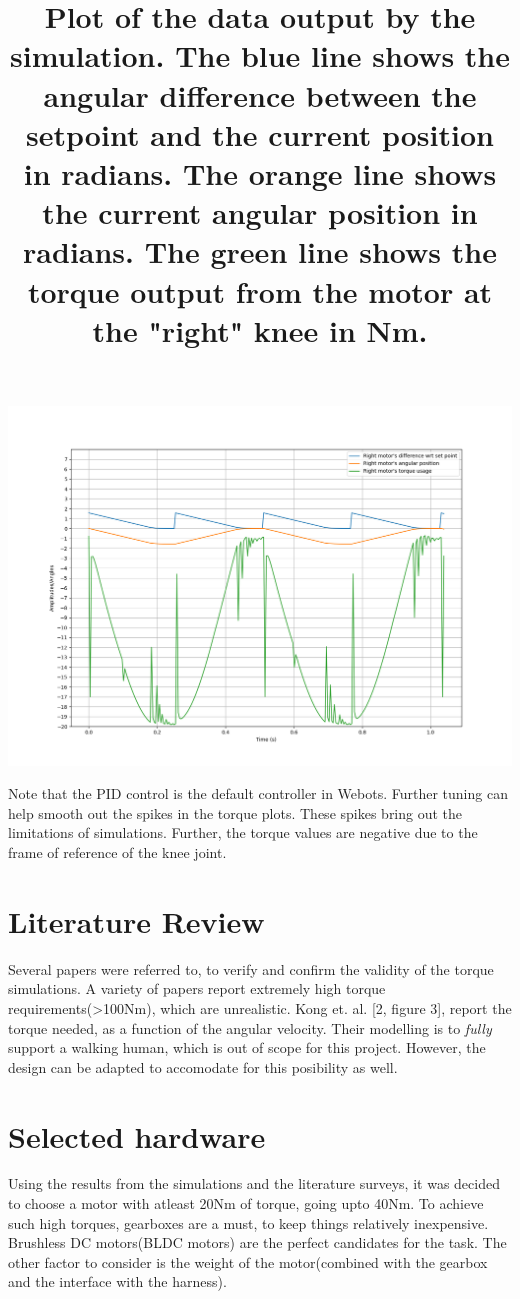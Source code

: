 \documentclass[a4paper]{article}
\begin{document}
		\begin{center}
			\includegraphics[width=\linewidth]{"../images/sim_results.png"}
			\title{Plot of the data output by the simulation. The blue line shows the angular difference between the setpoint and the current position in radians. The orange line shows the current angular position in radians. The green line shows the torque output from the motor at the "right" knee in Nm.}
		\end{center}

		Note that the PID control is the default controller in Webots. Further tuning can help smooth out the spikes in the torque plots. These spikes bring out the limitations of simulations. Further, the torque values are negative due to the frame of reference of the knee joint.

	\section{Literature Review}
		Several papers were referred to, to verify and confirm the validity of the torque simulations. A variety of papers report extremely high torque requirements(>100Nm), which are unrealistic. Kong et. al. [2, figure 3], report the torque needed, as a function of the angular velocity. Their modelling is to \textit{fully} support a walking human, which is out of scope for this project. However, the design can be adapted to accomodate for this posibility as well.

	\section{Selected hardware}
		Using the results from the simulations and the literature surveys, it was decided to choose a motor with atleast 20Nm of torque, going upto 40Nm. To achieve such high torques, gearboxes are a must, to keep things relatively inexpensive. Brushless DC motors(BLDC motors) are the perfect candidates for the task. The other factor to consider is the weight of the motor(combined with the gearbox and the interface with the harness).\\
\end{document}
